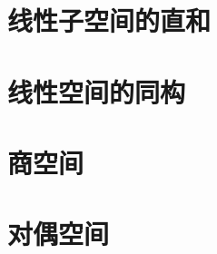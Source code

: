 \documentclass[12pt, a4paper, oneside, UTF8]{ctexbook}
\begin{document}
	\section{线性子空间的直和}
	\section{线性空间的同构}
	\section{商空间}
	\section{对偶空间}
\ifx\allfiles\undefined
\end{document}
